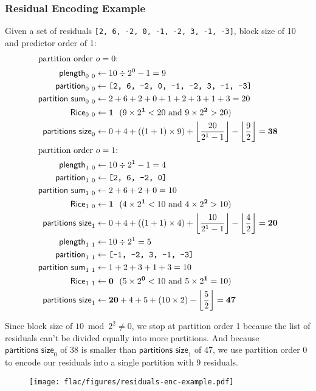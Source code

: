 \subsubsection{Residual Encoding Example}
Given a set of residuals \texttt{[2, 6, -2, 0, -1, -2, 3, -1, -3]},
block size of 10 and predictor order of 1:
{
  \begin{align*}
  \intertext{$\text{partition order}~o = 0$:}
  \textsf{plength}_{0~0} &\leftarrow 10 \div 2 ^ 0 - 1 = 9 \\
  \textsf{partition}_{0~0} &\leftarrow \texttt{[2, 6, -2, 0, -1, -2, 3, -1, -3]} \\
  \textsf{partition sum}_{0~0} &\leftarrow 2 + 6 + 2 + 0 + 1 + 2 + 3 + 1 + 3 = 20 \\
  \textsf{Rice}_{0~0} &\leftarrow \textbf{1}~~(9 \times 2 ^ \textbf{1} < 20 \text{ and } 9 \times 2 ^ \textbf{2} > 20) \\
  \textsf{partitions size}_0 &\leftarrow 0 + 4 + ((1 + 1) \times 9) + \left\lfloor\frac{20}{2 ^ 1 - 1}\right\rfloor - \left\lfloor\frac{9}{2}\right\rfloor = \textbf{38} \\
  \intertext{$\text{partition order}~o = 1$:}
  \textsf{plength}_{1~0} &\leftarrow 10 \div 2 ^ 1 - 1 = 4 \\
  \textsf{partition}_{1~0} &\leftarrow \texttt{[2, 6, -2, 0]} \\
  \textsf{partition sum}_{1~0} &\leftarrow 2 + 6 + 2 + 0 = 10 \\
  \textsf{Rice}_{1~0} &\leftarrow \textbf{1}~~(4 \times 2 ^ \textbf{1} < 10 \text{ and } 4 \times 2 ^ \textbf{2} > 10) \\
  \textsf{partitions size}_1 &\leftarrow 0 + 4 + ((1 + 1) \times 4) + \left\lfloor\frac{10}{2 ^ 1 - 1}\right\rfloor - \left\lfloor\frac{4}{2}\right\rfloor = \textbf{20} \\
  \textsf{plength}_{1~1} &\leftarrow 10 \div 2 ^ 1 = 5 \\
  \textsf{partition}_{1~1} &\leftarrow \texttt{[-1, -2, 3, -1, -3]} \\
  \textsf{partition sum}_{1~1} &\leftarrow 1 + 2 + 3 + 1 + 3 = 10 \\
  \textsf{Rice}_{1~1} &\leftarrow \textbf{0}~~(5 \times 2 ^ \textbf{0} < 10 \text{ and } 5 \times 2 ^ \textbf{1} = 10) \\
  \textsf{partitions size}_1 &\leftarrow \textbf{20} + 4 + 5 + (10 \times
  2) - \left\lfloor\frac{5}{2}\right\rfloor = \textbf{47}
\end{align*}}
\par
\noindent
Since block size of $10 \bmod 2 ^ 2 \neq 0$, we stop at partition order 1
because the list of residuals can't be divided equally into more partitions.
And because $\textsf{partitions size}_0$ of 38 is smaller than
$\textsf{partitions size}_1$ of 47, we use partition order 0
to encode our residuals into a single partition with 9 residuals.

\begin{figure}[h]
  \texttt{[image: flac/figures/residuals-enc-example.pdf]}
\end{figure}
